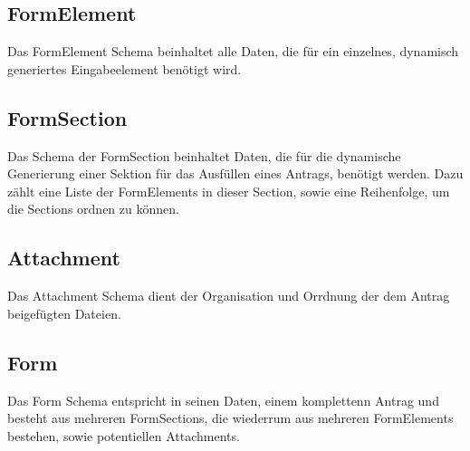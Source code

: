 \subsection{FormElement}
Das FormElement Schema beinhaltet alle Daten, die für ein einzelnes, dynamisch generiertes 
Eingabeelement benötigt wird.

\subsection{FormSection}
Das Schema der FormSection beinhaltet Daten, die für die dynamische Generierung einer Sektion
für das Ausfüllen eines Antrags, benötigt werden. Dazu zählt eine Liste der FormElements in 
dieser Section, sowie eine Reihenfolge, um die Sections ordnen zu können.

\subsection{Attachment}
Das Attachment Schema dient der Organisation und Orrdnung der dem Antrag beigefügten Dateien.

\subsection{Form}
Das Form Schema entspricht in seinen Daten, einem komplettenn Antrag und besteht aus mehreren 
FormSections, die wiederrum aus mehreren FormElements bestehen, sowie potentiellen Attachments.